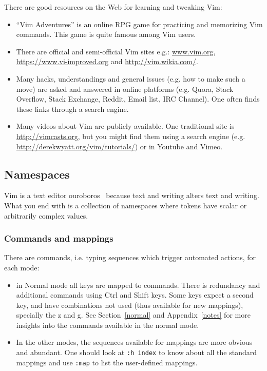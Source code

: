 \documentclass{article}
\newcommand{\tttt}[1]{\texttt{#1}}
\begin{document}
There are good resources on the Web for learning
and tweaking Vim:
\begin{itemize}
  \item ``Vim Adventures'' is an online RPG game for practicing
  and memorizing Vim commands. This game is quite famous among Vim users.
  \item There are official and semi-official Vim sites e.g.:
  \url{www.vim.org}, \url{https://www.vi-improved.org} and
  \url{http://vim.wikia.com/}.
  \item Many hacks, understandings and general issues
  (e.g. how to make such a move) are asked and answered
  in online platforms (e.g. Quora, Stack Overflow, Stack Exchange, Reddit, Email list, IRC Channel).
  One often finds these links through a search engine.
  \item Many videos about Vim are publicly available.
  One traditional site is \url{http://vimcasts.org},
  but you might find them using a search engine
  (e.g. \url{http://derekwyatt.org/vim/tutorials/}) or in Youtube and Vimeo.
\end{itemize}

\subsection{Namespaces}\label{namespaces}
Vim is a text editor ouroboros~\cite{ouroWiki} because
text and writing alters text and writing.
What you end with is a collection of namespaces where tokens have scalar
or arbitrarily complex values.

\subsubsection{Commands and mappings}
There are commands, i.e. typing sequences which trigger automated actions,
for each mode:
\begin{itemize}
	\item in Normal mode all keys are mapped to commands.
		There is redundancy and additional commands
		using Ctrl and Shift keys.
		Some keys expect a second key,
    and have combinations not used (thus available for new mappings),
		specially the z and g.
    See Section~\ref{normal} and Appendix~\ref{notes}
    for more insights into the commands available in the
    normal mode.
	\item In the other modes, the sequences available for mappings are more obvious and abundant.
		One should look at \tttt{:h index} to know about all the standard mappings
		and use \tttt{:map} to list the user-defined mappings.
\end{itemize}
\end{document}
